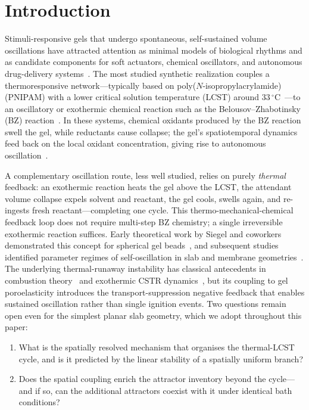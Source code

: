 \documentclass[aps,pre,reprint,superscriptaddress,longbibliography,floatfix]{revtex4-2}
\begin{document}
\section{Introduction}
\label{sec:intro}

Stimuli-responsive gels that undergo spontaneous, self-sustained volume
oscillations have attracted attention as minimal models of biological
rhythms and as candidate components for soft actuators, chemical
oscillators, and autonomous drug-delivery
systems~\cite{Yoshida2014,Yashin2006,Yashin2012}. The most studied synthetic
realization couples a thermoresponsive network---typically based on
poly($N$-isopropylacrylamide) (PNIPAM) with a lower critical solution
temperature (LCST) around $33\,^\circ\mathrm{C}$~\cite{Heskins1968,Halperin2015}---to an oscillatory or
exothermic chemical reaction such as the Belousov--Zhabotinsky (BZ)
reaction~\cite{Yoshida1996,Yoshida2010}. In these systems, chemical
oxidants produced by the BZ reaction swell the gel, while reductants
cause collapse; the gel's spatiotemporal dynamics feed back on the local
oxidant concentration, giving rise to autonomous
oscillation~\cite{Yashin2006}.

A complementary oscillation route, less well studied, relies on purely
\emph{thermal} feedback: an exothermic reaction heats the gel above the
LCST, the attendant volume collapse expels solvent and reactant, the gel
cools, swells again, and re-ingests fresh reactant---completing one
cycle. This thermo-mechanical-chemical feedback loop does not require
multi-step BZ chemistry; a single irreversible exothermic reaction
suffices. Early theoretical work by Siegel and coworkers demonstrated
this concept for spherical gel beads~\cite{Siegel1988,Siegel1993}, and
subsequent studies identified parameter regimes of self-oscillation in
slab and membrane geometries~\cite{Zarzycki2020,Boissonade2003,BoissonadeDeKepper2011}.
The underlying thermal-runaway instability has classical antecedents in
combustion theory~\cite{FrankKamenetskii1969} and exothermic CSTR
dynamics~\cite{Uppal1974}, but its coupling to gel poroelasticity
introduces the transport-suppression negative feedback that enables
sustained oscillation rather than single ignition events.
Two questions remain open even for the simplest planar slab geometry,
which we adopt throughout this paper:
\begin{enumerate}
  \item What is the spatially resolved mechanism that organises the
    thermal-LCST cycle, and is it predicted by the linear stability of
    a spatially uniform branch?
  \item Does the spatial coupling enrich the attractor inventory
    beyond the cycle---and if so, can the additional attractors
    coexist with it under identical bath conditions?
\end{enumerate}
\end{document}
